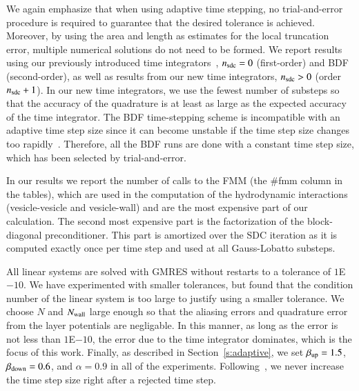 We again emphasize that when using adaptive time stepping, no
trial-and-error procedure is required to guarantee that the desired
tolerance is achieved.  Moreover, by using the area and length as
estimates for the local truncation error, multiple numerical solutions
do not need to be formed.  We report results using our previously
introduced time integrators~\cite{qua:bir2014b}, $n_{{\mathrm{sdc}}}=0$
(first-order) and BDF (second-order), as well as results from our new
time integrators, $n_{{\mathrm{sdc}}}>0$ (order $n_{{\mathrm{sdc}}}+1$).  In our new time
integrators, we use the fewest number of substeps so that the accuracy
of the quadrature is at least as large as the expected accuracy of the
time integrator.  The BDF time-stepping scheme is incompatible with an
adaptive time step size since it can become unstable if the time step
size changes too rapidly~\cite{dah:lin:nev1983}.  Therefore, all the
BDF runs are done with a constant time step size, which has been
selected by trial-and-error.

In our results we report the number of calls to the FMM (the \#fmm
column in the tables), which are used in the computation of the
hydrodynamic interactions (vesicle-vesicle and vesicle-wall) and are
the most expensive part of our calculation. The second most expensive
part is the factorization of the block-diagonal preconditioner. This
part is amortized over the SDC iteration as it is computed exactly once
per time step and used at all Gauss-Lobatto substeps.

All linear systems are solved with GMRES without restarts to a tolerance
of $1$E$-10$.  We have experimented with smaller tolerances, but found
that the condition number of the linear system is too large to justify
using a smaller tolerance.  We choose $N$ and $N_{{\mathrm{wall}}}$ large enough
so that the aliasing errors and quadrature error from the layer
potentials are negligable.  In this manner, as long as the error is not
less than $1$E$-10$, the error due to the time integrator dominates,
which is the focus of this work.  Finally, as described in
Section~\ref{s:adaptive}, we set $\beta_{{\mathrm{up}}} = 1.5$, $\beta_{{\mathrm{down}}} =
0.6$, and $\alpha = 0.9$ in all of the experiments.
Following~\cite{hai:nor:wan1993}, we never increase the time step size
right after a rejected time step.

